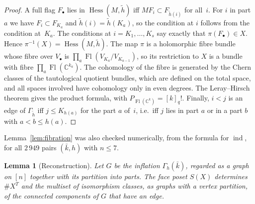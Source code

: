 \documentclass[11pt,a4paper]{article}
\numberwithin{equation}{section}
\theoremstyle{plain}
\newtheorem{lemma}[theorem]{Lemma}
\theoremstyle{definition}
\theoremstyle{remark}
\newcommand{\C}{\mathbb{C}}
\DeclareMathOperator{\Fl}{Fl}
\DeclareMathOperator{\Hess}{Hess}
\begin{document}
\begin{proof}
A full flag $F_\bullet$ lies in $\Hess(M,\tilde h)$ iff $MF_i\subset F_{\tilde h(i)}$ for all~$i$. For $i$ in part $a$ we have $F_i\subset F_{K_a}$ and $\tilde h(i)=\tilde h(K_a)$, so the condition at $i$ follows from the condition at~$K_a$. The conditions at $i=K_1,\dots,K_s$ say exactly that $\pi(F_\bullet)\in X$. Hence $\pi^{-1}(X)=\Hess(M,\tilde h)$. The map $\pi$ is a holomorphic fibre bundle whose fibre over $V_\bullet$ is $\prod_a\Fl(V_{K_a}/V_{K_{a-1}})$, so its restriction to $X$ is a bundle with fibre $\prod_a\Fl(\C^{k_a})$. The cohomology of the fibre is generated by the Chern classes of the tautological quotient bundles, which are defined on the total space, and all spaces involved have cohomology only in even degrees. The Leray--Hirsch theorem gives the product formula, with $P_{\Fl(\C^k)}=[k]_q!$. Finally, $i<j$ is an edge of $\Gamma_{\tilde h}$ iff $j\leqslant K_{h(a)}$ for the part $a$ of~$i$, i.e.\ iff $j$ lies in part $a$ or in a part $b$ with $a<b\leqslant h(a)$.
\end{proof}

Lemma~\ref{lem:fibration} was also checked numerically, from the formula for $\operatorname{ind}$, for all $2\,949$ pairs $(\bar k,h)$ with $n\leqslant7$.

\begin{lemma}[Reconstruction]\label{lem:reconstruct}
Let $G$ be the inflation $\Gamma_h(\bar k)$, regarded as a graph on $[n]$ together with its partition into parts. The face poset $S(X)$ determines $\#X^T$ and the multiset of isomorphism classes, as graphs with a vertex partition, of the connected components of $G$ that have an edge.
\end{lemma}
\end{document}
